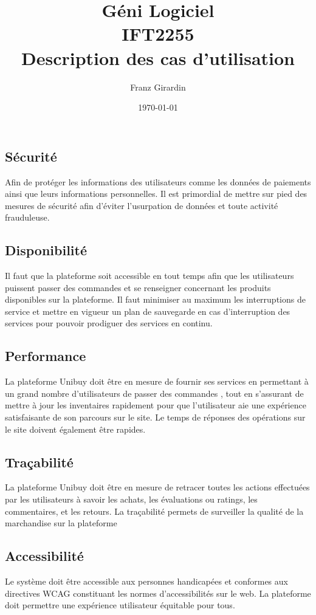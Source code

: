 \documentclass[16pt]{report}
\title{\Huge{Géni Logiciel}\\{IFT2255}\\{\textbf{Description des cas d'utilisation}}}
\author{\huge{Franz Girardin}}
\date{\today}
\begin{document}
\fontsize{12}{12}\selectfont
\subsection*{Sécurité}
Afin de protéger les informations des utilisateurs comme les données de paiements ainsi que leurs informations personnelles. 
Il est primordial de mettre sur pied  des mesures de sécurité afin d'éviter l’usurpation de données et toute activité frauduleuse.
\subsection*{Disponibilité} 
Il faut que la plateforme soit accessible en tout temps afin que les utilisateurs puissent passer des commandes  et  
se renseigner concernant les produits disponibles sur la plateforme. Il faut minimiser au maximum les interruptions 
de service et mettre en vigueur un plan de sauvegarde en cas d’interruption des services pour pouvoir prodiguer des 
services en continu.
\subsection*{Performance}
La plateforme Unibuy doit être en mesure de fournir ses services en permettant à un grand nombre d’utilisateurs de 
passer des commandes , tout en s’assurant de mettre à jour les inventaires rapidement pour que l’utilisateur aie 
une expérience satisfaisante de son parcours sur le site. Le temps de réponses des opérations sur le site doivent 
également être rapides.
\subsection*{Traçabilité}
La plateforme Unibuy doit être en mesure de retracer toutes les actions effectuées par les utilisateurs à savoir les 
achats, les évaluations ou ratings, les commentaires, et les retours. La traçabilité permets de surveiller la qualité 
de la marchandise sur la plateforme
\subsection*{Accessibilité}
Le système doit être accessible aux personnes handicapées et conformes aux directives WCAG constituant les normes 
d'accessibilités sur le web. La plateforme doit permettre une expérience utilisateur équitable pour tous.
\end{document}
